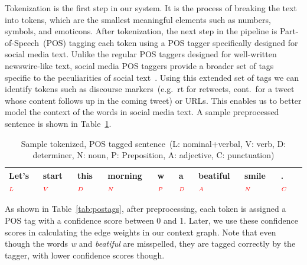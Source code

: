 \documentclass[a4paper,onesided,12pt]{report}
\begin{document}
Tokenization is the first step in our system. It is the process of breaking the text into tokens, which are the smallest meaningful elements such as numbers, symbols, and emoticons. After tokenization, the next step in the pipeline is Part-of-Speech~(POS) tagging each token using a POS tagger specifically designed for social media text. Unlike the regular POS taggers designed for well-written newswire-like text, social media POS taggers provide a broader set of tags specific to the peculiarities of social text~\cite{owoputi2013improved,Gimpel:2011:PTT:2002736.2002747}. Using this extended set of tags we can identify tokens such as discourse markers~(e.g.~rt for retweets, cont.~for a tweet whose content follows up in the coming tweet) or URLs. This enables us to better model the context of the words in social media text. A sample preprocessed sentence is shown in Table~\ref{tab:postagged}.

\begin{table}[tbhp]
\caption{Sample tokenized, POS tagged sentence~(L: nominal+verbal, V: verb, D: determiner, N: noun, P: Preposition, A: adjective, C: punctuation)}
\centering
\begin{tabular}{|l|l|l|l|l|l|l|l|l|l|}
\hline
Let's$_{\textcolor{red}{L}}$ & start$_{\textcolor{red}V}$ & this$_{\textcolor{red}D}$ & morning$_{\textcolor{red}N}$ & w$_{\textcolor{red}P}$ & a$_{\textcolor{red}D}$ & beatiful$_{\textcolor{red}A}$ & smile$_{\textcolor{red}N}$ & .$_{\textcolor{red}C}$\\
\hline
\end{tabular}
\label{tab:postagged}
\end{table}


As shown in Table~\ref{tab:postags}, after preprocessing, each token is assigned a POS tag with a confidence score between 0 and 1. Later, we use these confidence scores in calculating the edge weights in our context graph. Note that even though the words \emph{w} and\emph{ beatiful} are misspelled, they are tagged correctly by the tagger, with lower confidence scores though.
\end{document}
